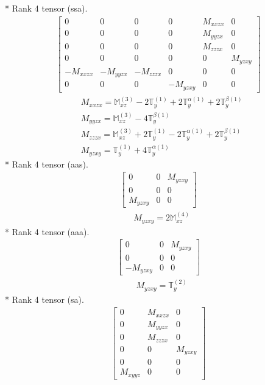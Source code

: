 \documentclass[fleqn,8pt,landscape]{jsarticle}
\begin{document}
* Rank 4 tensor (ssa).
\begin{align*}
\begin{bmatrix} 0 & 0 & 0 & 0 & M_{xxzx} & 0 \\ 0 & 0 & 0 & 0 & M_{yyzx} & 0 \\ 0 & 0 & 0 & 0 & M_{zzzx} & 0 \\ 0 & 0 & 0 & 0 & 0 & M_{yzxy} \\ - M_{xxzx} & - M_{yyzx} & - M_{zzzx} & 0 & 0 & 0 \\ 0 & 0 & 0 & - M_{yzxy} & 0 & 0 \end{bmatrix}
\end{align*}
\begin{align*}
& M_{xxzx} = \mathbb{M}_{xz}^{(3)} - 2 \mathbb{T}_{y}^{(1)} + 2 \mathbb{T}_{y}^{\alpha(1)} + 2 \mathbb{T}_{y}^{\beta(1)} \\
& M_{yyzx} = \mathbb{M}_{xz}^{(3)} - 4 \mathbb{T}_{y}^{\beta(1)} \\
& M_{zzzx} = \mathbb{M}_{xz}^{(3)} + 2 \mathbb{T}_{y}^{(1)} - 2 \mathbb{T}_{y}^{\alpha(1)} + 2 \mathbb{T}_{y}^{\beta(1)} \\
& M_{yzxy} = \mathbb{T}_{y}^{(1)} + 4 \mathbb{T}_{y}^{\alpha(1)}
\end{align*}
* Rank 4 tensor (aas).
\begin{align*}
\begin{bmatrix} 0 & 0 & M_{yzxy} \\ 0 & 0 & 0 \\ M_{yzxy} & 0 & 0 \end{bmatrix}
\end{align*}
\begin{align*}
& M_{yzxy} = 2 \mathbb{M}_{xz}^{(4)}
\end{align*}
* Rank 4 tensor (aaa).
\begin{align*}
\begin{bmatrix} 0 & 0 & M_{yzxy} \\ 0 & 0 & 0 \\ - M_{yzxy} & 0 & 0 \end{bmatrix}
\end{align*}
\begin{align*}
& M_{yzxy} = \mathbb{T}_{y}^{(2)}
\end{align*}
* Rank 4 tensor (sa).
\begin{align*}
\begin{bmatrix} 0 & M_{xxzx} & 0 \\ 0 & M_{yyzx} & 0 \\ 0 & M_{zzzx} & 0 \\ 0 & 0 & M_{yzxy} \\ 0 & 0 & 0 \\ M_{xyyz} & 0 & 0 \end{bmatrix}
\end{align*}
\end{document}

